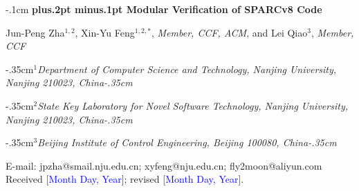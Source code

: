 \documentclass[twoside]{article}
\def\title#1{\vspace{3mm}\begin{flushleft}\vglue-.1cm\Large\bf\boldmath\protect\baselineskip=18pt plus.2pt minus.1pt #1
\end{flushleft}\vspace{1mm} }
\def\author#1{\begin{flushleft}\normalsize #1\end{flushleft}\vspace*{-4pt} \vspace{3mm}}
\def\address#1#2{\begin{flushleft}\vglue-.35cm${}^{#1}$\small\it #2\vglue-.35cm\end{flushleft}\vspace{-2mm}\par}
\begin{document}
\begin{CJK*}{GBK}{song}
\thispagestyle{empty}
\vspace*{-13mm}
\vspace*{2mm}

\title{Modular Verification of SPARCv8 Code}

\author{Jun-Peng Zha$^{1,2}$, Xin-Yu Feng$^{1,2,*}$, \textit{Member, CCF, ACM}, 
  and Lei Qiao$^{3}$, \textit{Member, CCF}}

\address{1}{Department of Computer Science and Technology, Nanjing University, Nanjing 210023, China}
\address{2}{State Key Laboratory for Novel Software Technology, Nanjing University, Nanjing 210023, China}
\address{3}{Beijing Institute of Control Engineering, Beijing 100080, China}

\vspace{2mm}

\noindent E-mail: jpzha@smail.nju.edu.cn; xyfeng@nju.edu.cn;
fly2moon@aliyun.com  \\[-1mm]





\noindent Received [\textcolor{blue}{Month Day, Year}]; revised [\textcolor{blue}{Month Day, Year}].\\[1mm]


\end{CJK*}
\end{document}
